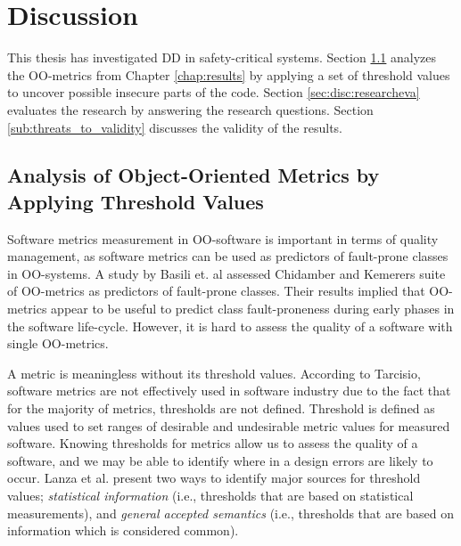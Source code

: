 
\chapter{Discussion}
\label{chap:discussion}

This thesis has investigated DD in safety-critical systems. Section \ref{sec:dis-analysis} analyzes the OO-metrics from Chapter \ref{chap:results} by applying a set of threshold values to uncover possible insecure parts of the code. Section \ref{sec:disc:researcheva} evaluates the research by answering the research questions. Section \ref{sub:threats_to_validity} discusses the validity of the results.


\section{Analysis of Object-Oriented Metrics by Applying Threshold Values}
\label{sec:dis-analysis}
Software metrics measurement in OO-software is important in terms of quality management\cite{tarcisio,ferreira2012identifying}, as software metrics can be used as predictors of fault-prone classes in OO-systems\cite{basili1996validation}. A study by Basili et. al\cite{basili1996validation} assessed Chidamber and Kemerers\cite{chidamber1994metrics} suite of OO-metrics as predictors of fault-prone classes. Their results implied that OO-metrics appear to be useful to predict class fault-proneness during early phases in the software life-cycle. However, it is hard to assess the quality of a software with single OO-metrics. 

A metric is meaningless without its threshold values. According to Tarcisio\cite{tarcisio}, software metrics are not effectively used in software industry due to the fact that for the majority of metrics, thresholds are not defined. Threshold is defined as values used to set ranges of desirable and undesirable metric values for measured software\cite{ferreira2012identifying}. Knowing thresholds for metrics allow us to assess the quality of a software, and we may be able to identify where in a design errors are likely to occur. Lanza et al.\cite{lanza2007object} present two ways to identify major sources for threshold values; \textit{statistical information} (i.e., thresholds that are based on statistical measurements), and \textit{general accepted semantics} (i.e., thresholds that are based on information which is considered common).  

